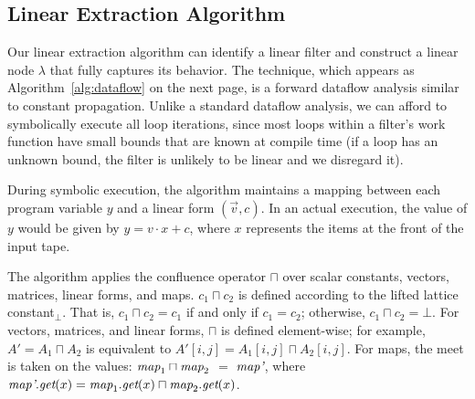 \subsection{Linear Extraction Algorithm}
\label{sec:dataflow}

Our linear extraction algorithm can identify a linear filter and
construct a linear node $\lambda$ that fully captures its behavior.
The technique, which appears as Algorithm~\ref{alg:dataflow} on the
next page, is a forward dataflow analysis similar to constant
propagation.  Unlike a standard dataflow analysis, we can afford to
symbolically execute all loop iterations, since most loops within a
filter's work function have small bounds that are known at compile
time (if a loop has an unknown bound, the filter is unlikely to be
linear and we disregard it).

During symbolic execution, the algorithm maintains a mapping between
each program variable $y$ and a linear form $({\vec v}, c)$.  In an
actual execution, the value of $y$ would be given by $y = v \cdot x +
c$, where $x$ represents the items at the front of the input tape.

The algorithm applies the confluence operator $\sqcap$ over scalar
constants, vectors, matrices, linear forms, and maps.  $c_1 \sqcap
c_2$ is defined according to the lifted lattice constant$_{\bot}$.
That is, $c_1 \sqcap c_2 = c_1$ if and only if $c_1 = c_2$; otherwise,
$c_1 \sqcap c_2 = \bot$.  For vectors, matrices, and linear forms,
$\sqcap$ is defined element-wise; for example, $A' = A_1 \sqcap A_2$
is equivalent to $A'[i,j] = A_1[i,j] \sqcap A_2[i,j]$.  For maps, the
meet is taken on the values: $\mbox{\it map}_1 \sqcap \mbox{\it map}_2$ $=$
$\mbox{\it map'}$, where $\mbox{\it map'}.\mbox{\it get}(x) = \mbox{\it map}_1.\mbox{\it get}(x)
\sqcap \mbox{\it map}_2.\mbox{\it get}(x)$.

\newcommand{\la}{$\leftarrow$}
\newcommand{\IND}{\begin{ALC@g}}
\newcommand{\UND}{\end{ALC@g}}
\newcommand{\tup}[2]{\langle{#1}, {#2}\rangle}

